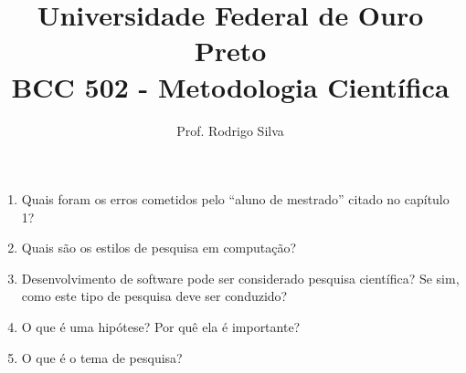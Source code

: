 \documentclass{article}
\title{\vspace{-2 cm}Universidade Federal de Ouro Preto \\ BCC 502 - Metodologia Científica}
\author{Prof. Rodrigo Silva}
\date{}
\begin{document}
\maketitle



\begin{enumerate}

\item Quais foram os erros cometidos pelo ``aluno de mestrado'' citado no capítulo 1?

\item Quais são os estilos de pesquisa em computação?

\item Desenvolvimento de software pode ser considerado pesquisa científica? Se sim, como este tipo de pesquisa deve ser conduzido?

\item O que é uma hipótese? Por quê ela é importante?

\item O que é o tema de pesquisa?

\end{enumerate}


%
%
\end{document}
